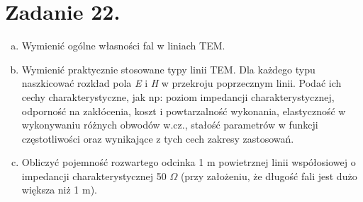\section*{Zadanie 22.}
\begin{task}
\begin{enumerate}[a)]
\item Wymienić ogólne własności fal w liniach TEM.
\item Wymienić praktycznie stosowane typy linii TEM. Dla każdego typu naszkicować rozkład pola \textsl{E} i \textsl{H} w przekroju poprzecznym linii. Podać ich cechy charakterystyczne, jak np: poziom impedancji charakterystycznej, odporność na zakłócenia, koszt i powtarzalność wykonania, elastyczność w wykonywaniu różnych obwodów w.cz., stałość parametrów w funkcji częstotliwości oraz wynikające z tych cech zakresy zastosowań.
\item Obliczyć pojemność rozwartego odcinka 1 m powietrznej linii współosiowej o impedancji charakterystycznej 50 $\Omega$ (przy założeniu, że długość fali jest dużo większa niż 1 m).\\
\end{enumerate}
\end{task}

